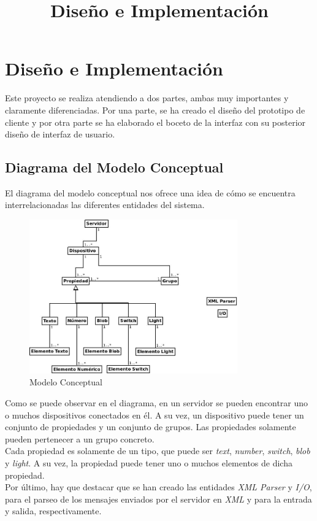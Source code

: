 \chapter{Diseño e Implementación}
\title{Diseño e Implementación}
\label{cap:DisenoEImplementacion}
Este proyecto se realiza atendiendo a dos partes, ambas muy importantes y claramente diferenciadas. Por una parte, se ha creado el diseño del prototipo de cliente y por otra parte se ha elaborado el boceto de la interfaz con su posterior diseño de interfaz de usuario.

\section{Diagrama del Modelo Conceptual}
El diagrama del modelo conceptual nos ofrece una idea de cómo se encuentra interrelacionadas las diferentes entidades del sistema.
\begin{figure}[htb]
\centering
\includegraphics[width=0.8\textwidth]{./imagenes/diagramaConceptual}
\caption{Modelo Conceptual} \label{fig:diagramaConceptual}
\end{figure}

Como se puede observar en el diagrama, en un servidor se pueden encontrar uno o muchos dispositivos conectados en él.
A su vez, un dispositivo puede tener un conjunto de propiedades y un conjunto de grupos. Las propiedades solamente pueden pertenecer a un grupo concreto.\\
Cada propiedad es solamente de un tipo, que puede ser \textit{text}, \textit{number}, \textit{switch}, \textit{blob} y \textit{light}. A su vez, la propiedad puede tener uno o muchos elementos de dicha propiedad.\\

Por último, hay que destacar que se han creado las entidades \textit{XML Parser} y \textit{I/O}, para el parseo de los mensajes enviados por el servidor en \textit{XML} y para la entrada y salida, respectivamente.


